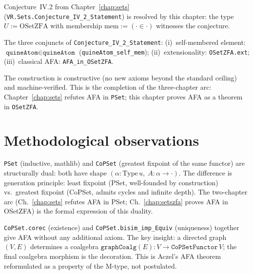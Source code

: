 \begin{theorem}
\label{thm:IV2_resolved}
\leanok
{}
Conjecture~IV.2 from Chapter~\ref{chap:sets}
(\texttt{VR.Sets.Conjecture\_IV\_2\_Statement}) is resolved by this
chapter: the type $U := \mathrm{OSetZFA}$ with membership
$\mathrm{mem} := ({\cdot} \in {\cdot})$ witnesses the conjecture.

The three conjuncts of \texttt{Conjecture\_IV\_2\_Statement}:
(i)~self-membered element: $\texttt{quineAtom} \in \texttt{quineAtom}$
    (\texttt{quineAtom\_self\_mem});
(ii)~extensionality: \texttt{OSetZFA.ext};
(iii)~classical AFA: \texttt{AFA\_in\_OSetZFA}.

The construction is constructive (no new axioms beyond the standard
ceiling) and machine-verified.  This is the completion of the
three-chapter arc: Chapter~\ref{chap:sets} refutes AFA in \texttt{PSet};
this chapter proves AFA as a theorem in \texttt{OSetZFA}.
\end{theorem}

\section{Methodological observations}
\label{sec:setszfa_method}

\begin{remark}
\label{rem:M1_dual}
\leanok
{}
\texttt{PSet} (inductive, mathlib) and \texttt{CoPSet} (greatest fixpoint
of the same functor) are structurally dual: both have shape $(\alpha :
\mathrm{Type}\,u,\; A : \alpha \to \cdot)$.  The difference is generation
principle: least fixpoint (PSet, well-founded by construction) vs.\ greatest
fixpoint (CoPSet, admits cycles and infinite depth).
The two-chapter arc (Ch.~\ref{chap:sets} refutes AFA in PSet;
Ch.~\ref{chap:setszfa} proves AFA in OSetZFA) is the formal expression of
this duality.
\end{remark}

\begin{remark}
\label{rem:M2_final_coalg}
\leanok
{}
\texttt{CoPSet.corec} (existence) and \texttt{CoPSet.bisim\_imp\_Equiv}
(uniqueness) together give AFA without any additional axiom.  The key
insight: a directed graph $(V, E)$ determines a coalgebra
$\texttt{graphCoalg}(E) : V \to \texttt{CoPSetFunctor}\,V$; the final
coalgebra morphism is the decoration.  This is Aczel's AFA theorem
reformulated as a property of the M-type, not postulated.
\end{remark}

